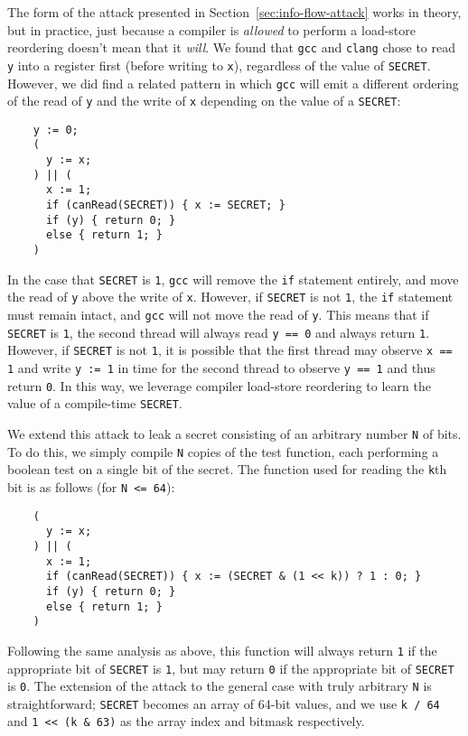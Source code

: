The form of the attack presented in Section~\ref{sec:info-flow-attack} works in
theory, but in practice, just because a compiler is \emph{allowed} to perform a
load-store reordering doesn't mean that it \emph{will}.
We found that \verb|gcc| and \verb|clang| chose to read \verb|y| into a
register first (before writing to \verb|x|), regardless of the value of
\verb|SECRET|.
However, we did find a related pattern in which \verb|gcc| will emit a
different ordering of the read of \verb|y| and the write of \verb|x| depending
on the value of a \verb|SECRET|:
\begin{verbatim}
    y := 0;
    (
      y := x;
    ) || (
      x := 1;
      if (canRead(SECRET)) { x := SECRET; }
      if (y) { return 0; }
      else { return 1; }
    )
\end{verbatim}
In the case that \verb|SECRET| is \verb|1|, \verb|gcc| will remove the
\verb|if| statement entirely, and move the read of \verb|y| above the write of
\verb|x|.
However, if \verb|SECRET| is not \verb|1|, the \verb|if| statement must remain
intact, and \verb|gcc| will not move the read of \verb|y|.
This means that if \verb|SECRET| is \verb|1|, the second thread will always
read \verb|y == 0| and always return \verb|1|.
However, if \verb|SECRET| is not \verb|1|, it is possible that the first thread
may observe \verb|x == 1| and write \verb|y := 1| in time for the second thread
to observe \verb|y == 1| and thus return \verb|0|.
In this way, we leverage compiler load-store reordering to learn the value of
a compile-time \verb|SECRET|.

We extend this attack to leak a secret consisting of an arbitrary number
\verb|N| of bits.
To do this, we simply compile \verb|N| copies of the test function, each
performing a boolean test on a single bit of the secret.
The function used for reading the \verb|k|th bit is as follows (for
\verb|N <= 64|):
\begin{verbatim}
    (
      y := x;
    ) || (
      x := 1;
      if (canRead(SECRET)) { x := (SECRET & (1 << k)) ? 1 : 0; }
      if (y) { return 0; }
      else { return 1; }
    )
\end{verbatim}
Following the same analysis as above, this function will always return \verb|1|
if the appropriate bit of \verb|SECRET| is \verb|1|, but may return \verb|0| if
the appropriate bit of \verb|SECRET| is \verb|0|.
The extension of the attack to the general case with truly arbitrary \verb|N|
is straightforward; \verb|SECRET| becomes an array of 64-bit values, and we use
\verb|k / 64| and \verb|1 << (k & 63)| as the array index and bitmask
respectively.

